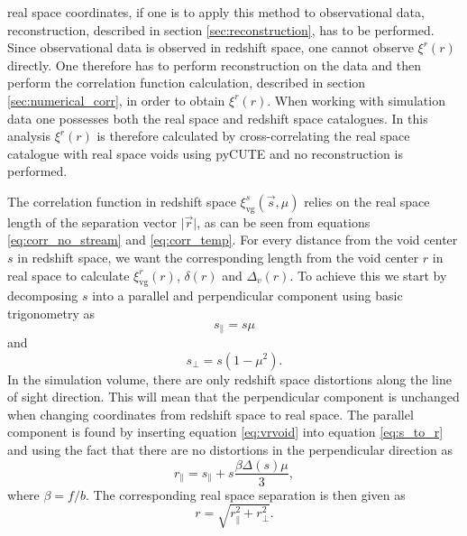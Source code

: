 real space coordinates, if one is to apply this method to observational data,
reconstruction, described in section \ref{sec:reconstruction}, has to be performed. Since observational data is observed in
redshift space, one cannot observe $\xi^r(r)$ directly. One therefore has to
perform reconstruction on the data and then perform the correlation function
calculation, described in section \ref{sec:numerical_corr}, in order to obtain
$\xi^r(r)$. When working with simulation data one possesses both the real space and redshift space catalogues. In this analysis $\xi^r(r)$ is therefore calculated by cross-correlating the real space catalogue with real space voids using pyCUTE and no reconstruction is performed. 
\\\indent

The correlation function in redshift space $\xi^s_{\mathrm{vg}}(\vec{s},\mu)$
relies on the real space length of the separation vector $\vert\vec{r}\vert$, as
can be seen from equations \ref{eq:corr_no_stream} and \ref{eq:corr_temp}. For every distance from the void center $s$ in
redshift space, we want the corresponding length from the void center $r$ in
real space to calculate $\xi^r_{\mathrm{vg}}(r)$, $\delta(r)$ and $\Delta_v(r)$.
To achieve this we start by decomposing $s$ into a parallel and perpendicular
component using basic trigonometry as
\begin{equation}
    s_\parallel=s\mu
\end{equation}
and
\begin{equation}
    s_\perp=s(1-\mu^2).
\end{equation}
In the simulation volume, there are only redshift space distortions along the line
of sight direction. This will mean that the perpendicular component is unchanged
when changing coordinates from redshift space to real space. The parallel
component is found by inserting equation \ref{eq:vrvoid} into equation \ref{eq:s_to_r} and using the fact that there are no distortions in the perpendicular direction as
\begin{equation}
    r_\parallel=s_\parallel + s\frac{\beta\Delta(s)\mu}{3},
\end{equation}
where $\beta=f/b$.
The corresponding real space separation is then given as
\begin{equation}
    r=\sqrt{r_\parallel^2+r_\perp^2}.
\end{equation}
